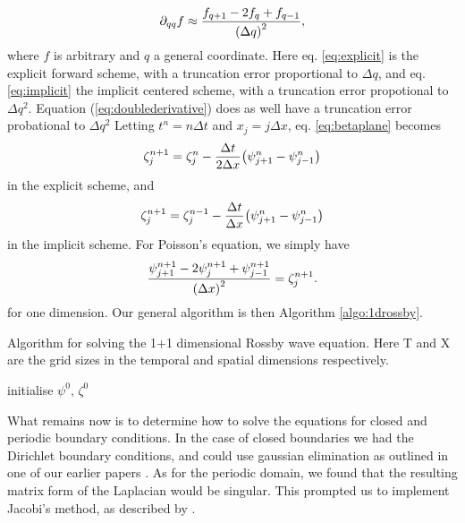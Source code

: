 	\begin{equation}
	\label{eq:doublederivative}
		\partial_{qq} f \approx \frac{f_{q+1} - 2f_q + f_{q-1}}{\qty(\Delta q)^2},
	\end{equation}
where $f$ is arbitrary and $q$ a general coordinate. Here eq. \ref{eq:explicit} is the explicit forward scheme, with a truncation error proportional to $\Delta q$, and eq. \ref{eq:implicit} the implicit centered scheme, with a truncation error propotional to $\Delta q^2$. Equation (\ref{eq:doublederivative}) does as well have a truncation error probational to $\Delta q^2$ Letting $t^n = n\Delta t$ and $x_j = j\Delta x$, eq. \ref{eq:betaplane} becomes
	\begin{equation}
	\label{eq:explicitscheme}
		\zeta^{n+1}_j = \zeta^n_j - \frac{\Delta t}{2 \Delta x}\qty(\psi^n_{j+1} - \psi^n_{j-1})
	\end{equation}
in the explicit scheme, and
	\begin{equation}
	\label{eq:implicitscheme}
		\zeta^{n+1}_j = \zeta^{n-1}_j - \frac{\Delta t}{\Delta x}\qty(\psi^n_{j+1} - \psi^n_{j-1})
	\end{equation}
in the implicit scheme. For Poisson's equation, we simply have
	\begin{equation}
	\label{eq:poissondiscret}
	\frac{\psi^{n+1}_{j+1} - 2\psi^{n+1}_j + \psi^{n+1}_{j-1}}{\qty(\Delta x)^2} = \zeta^{n+1}_j.
	\end{equation}
for one dimension.
Our general algorithm is then Algorithm \ref{algo:1drossby}.
	\begin{algorithm}[htbp]
		\caption{Algorithm for solving the 1+1 dimensional Rossby wave equation. Here T and X are the grid sizes in the temporal and spatial dimensions respectively.}
		\SetAlgoLined
		\BlankLine
		\BlankLine
		initialise $\psi^0,\, \zeta^0$\;
		\BlankLine
		\BlankLine
		\label{algo:1drossby}
	\end{algorithm}
What remains now is to determine how to solve the equations for closed and periodic boundary conditions.
In the case of closed boundaries we had the Dirichlet boundary conditions, and could use gaussian elimination as outlined in one of our earlier papers \citep{sjurkal}. As for the periodic domain, we found that the resulting matrix form of the Laplacian would be singular. This prompted us to implement Jacobi's method, as described by \citet{compphys}.

